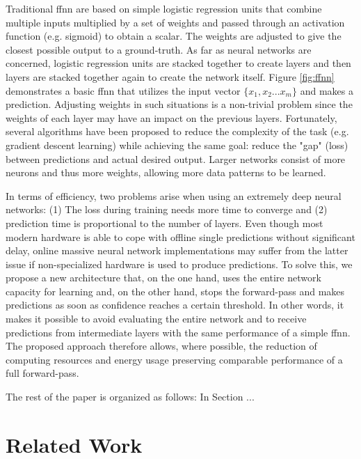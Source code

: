\documentclass[conference]{IEEEtran}
\begin{document}
Traditional \gls{ffnn} are based on simple logistic regression units that combine multiple inputs multiplied by a set of weights and passed through an activation function (e.g. sigmoid) to obtain a scalar. The weights are adjusted to give the closest possible output to a ground-truth. As far as neural networks are concerned, logistic regression units are stacked together to create layers and then layers are stacked together again to create the network itself. Figure \ref{fig:ffnn} demonstrates a basic \gls{ffnn} that utilizes the input vector $\lbrace x_{1}, x_{2} ... x_{m} \rbrace$ and makes a prediction. Adjusting weights in such situations is a non-trivial problem since the weights of each layer may have an impact on the previous layers. Fortunately, several algorithms have been proposed to reduce the complexity of the task (e.g. gradient descent learning) while achieving the same goal: reduce the "gap" (loss) between predictions and actual desired output. Larger networks consist of more neurons and thus more weights, allowing more data patterns to be learned.

In terms of efficiency, two problems arise when using an extremely deep neural networks: (1) The loss during training needs more time to converge and (2) prediction time is proportional to the number of layers. Even though most modern hardware is able to cope with offline single predictions without significant delay, online massive neural network implementations may suffer from the latter issue if non-specialized hardware is used to produce predictions. 
To solve this, we propose a new architecture that, on the one hand, uses the entire network capacity for learning and, on the other hand, stops the forward-pass and makes predictions as soon as confidence reaches a certain threshold. In other words, it makes it possible to avoid evaluating the entire network and to receive predictions from intermediate layers with the same performance of a simple \gls{ffnn}. The proposed approach therefore allows, where possible, the reduction of computing resources and energy usage preserving comparable performance of a full forward-pass.

The rest of the paper is organized as follows: In Section ...

\section{Related Work}
\end{document}
